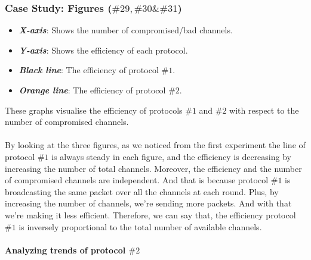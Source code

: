 \documentclass[main.tex]{subfiles}
\begin{document}
\subsubsection{Case Study: Figures ($\#29, \#30 \& \#31$)}
\begin{itemize}
\item \textbf{\textit{X-axis}}: Shows the number of compromised/bad channels.
\item \textbf{\textit{Y-axis}}: Shows the efficiency of each protocol.
\item \textbf{\textit{Black line}}: The efficiency of protocol $\#1$.
\item \textbf{\textit{Orange line}}: The efficiency of protocol $\#2$.\end{itemize}
These graphs visualise the efficiency of protocols $\#1$ and $\#2$ with respect to the number of compromised channels.
\paragraph{}
By looking at the three figures, as we noticed from the first experiment the line of protocol $\#1$ is always steady in each figure, and the efficiency is decreasing by increasing the number of total channels. Moreover, the efficiency and the number of compromised channels are independent. And that is because protocol $\#1$ is broadcasting the same packet over all the channels at each round. Plus,  by increasing the number of channels, we're sending more packets. And with that we're making it less efficient. Therefore, we can say that, the efficiency protocol $\#1$ is inversely proportional to the total number of available channels.
\paragraph{Analyzing trends of protocol $\#2$}
\end{document}

